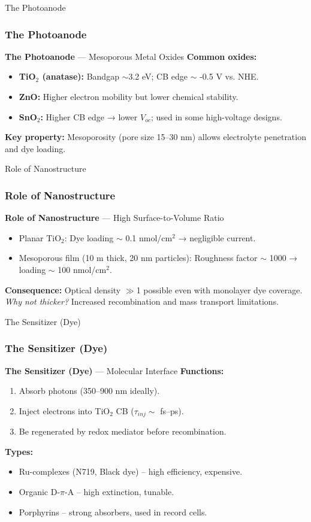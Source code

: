 \documentclass[aspectratio=169]{beamer}
\begin{document}
\begin{frame}{The Photoanode}
\frametitle{The Photoanode}

\textbf{The Photoanode} — Mesoporous Metal Oxides
\textbf{Common oxides:}
\begin{itemize}
\item \textbf{TiO$_2$ (anatase):} Bandgap $\sim$3.2 eV; CB edge $\sim$ -0.5 V vs. NHE.
\item \textbf{ZnO:} Higher electron mobility but lower chemical stability.
\item \textbf{SnO$_2$:} Higher CB edge → lower $V_{oc}$; used in some high-voltage designs.
\end{itemize}
\textbf{Key property:} Mesoporosity (pore size 15–30 nm) allows electrolyte penetration and dye loading.
\cite{Hagfeldt2010}
\end{frame}


\begin{frame}{Role of Nanostructure}
\frametitle{Role of Nanostructure}

\textbf{Role of Nanostructure} — High Surface-to-Volume Ratio
\begin{itemize}
\item Planar TiO$_2$: Dye loading $\sim$ 0.1 nmol/cm$^2$ → negligible current.
\item Mesoporous film (10 \textmu m thick, 20 nm particles): Roughness factor $\sim$ 1000 → loading $\sim$ 100 nmol/cm$^2$.
\end{itemize}
\textbf{Consequence:} Optical density $\gg$1 possible even with monolayer dye coverage.
\vspace{2mm}
\textit{Why not thicker?} Increased recombination and mass transport limitations.
\cite{Grätzel2005}
\end{frame}


\begin{frame}{The Sensitizer (Dye)}
\frametitle{The Sensitizer (Dye)}

\textbf{The Sensitizer (Dye)} — Molecular Interface
\textbf{Functions:}
\begin{enumerate}
\item Absorb photons (350–900 nm ideally).
\item Inject electrons into TiO$_2$ CB ($\tau_{inj} \sim$ fs–ps).
\item Be regenerated by redox mediator before recombination.
\end{enumerate}
\textbf{Types:}
\begin{itemize}
\item Ru-complexes (N719, Black dye) – high efficiency, expensive.
\item Organic D-$\pi$-A – high extinction, tunable.
\item Porphyrins – strong absorbers, used in record cells.
\end{itemize}
\cite{Mathew2014}
\end{frame}
\end{document}
